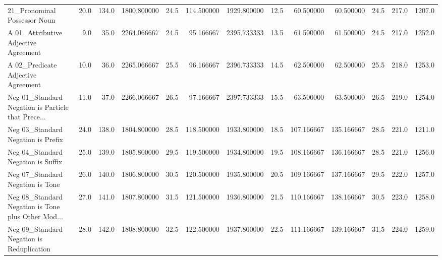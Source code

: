 \begin{tabular}{lrrrrrrrrrrrr}
21\_Pronominal Possessor Noun                       &          20.0 &         134.0 &   1800.800000 &       24.5 &  114.500000 &  1929.800000 &         12.5 &    60.500000 &    60.500000 &                  24.5 &                 217.0 &                1207.0 \\
A 01\_Attributive Adjective Agreement               &           9.0 &          35.0 &   2264.066667 &       24.5 &   95.166667 &  2395.733333 &         13.5 &    61.500000 &    61.500000 &                  24.5 &                 217.0 &                1252.0 \\
A 02\_Predicate Adjective Agreement                 &          10.0 &          36.0 &   2265.066667 &       25.5 &   96.166667 &  2396.733333 &         14.5 &    62.500000 &    62.500000 &                  25.5 &                 218.0 &                1253.0 \\
Neg 01\_Standard Negation is Particle that Prece... &          11.0 &          37.0 &   2266.066667 &       26.5 &   97.166667 &  2397.733333 &         15.5 &    63.500000 &    63.500000 &                  26.5 &                 219.0 &                1254.0 \\
Neg 03\_Standard Negation is Prefix                 &          24.0 &         138.0 &   1804.800000 &       28.5 &  118.500000 &  1933.800000 &         18.5 &   107.166667 &   135.166667 &                  28.5 &                 221.0 &                1211.0 \\
Neg 04\_Standard Negation is Suffix                 &          25.0 &         139.0 &   1805.800000 &       29.5 &  119.500000 &  1934.800000 &         19.5 &   108.166667 &   136.166667 &                  28.5 &                 221.0 &                1256.0 \\
Neg 07\_Standard Negation is Tone                   &          26.0 &         140.0 &   1806.800000 &       30.5 &  120.500000 &  1935.800000 &         20.5 &   109.166667 &   137.166667 &                  29.5 &                 222.0 &                1257.0 \\
Neg 08\_Standard Negation is Tone plus Other Mod... &          27.0 &         141.0 &   1807.800000 &       31.5 &  121.500000 &  1936.800000 &         21.5 &   110.166667 &   138.166667 &                  30.5 &                 223.0 &                1258.0 \\
Neg 09\_Standard Negation is Reduplication          &          28.0 &         142.0 &   1808.800000 &       32.5 &  122.500000 &  1937.800000 &         22.5 &   111.166667 &   139.166667 &                  31.5 &                 224.0 &                1259.0 \\

\end{tabular}
